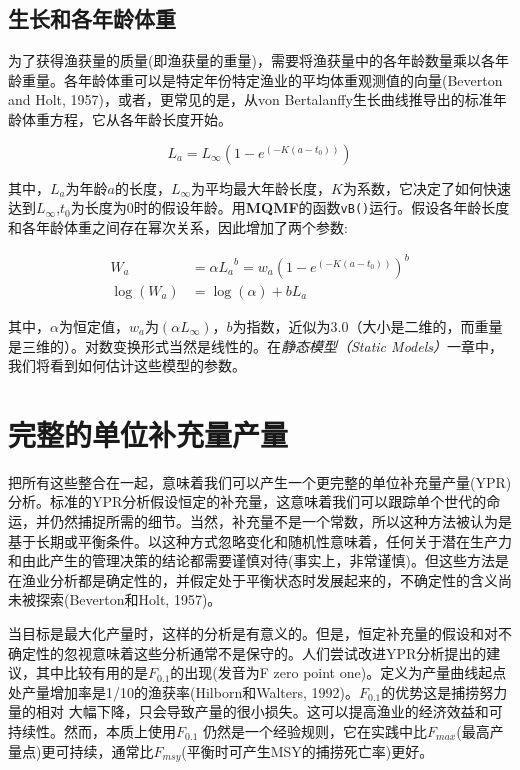 \documentclass[
  lang=cn,
  11pt,
  scheme=chinese,
  chinesefont=nofont,
  citestyle=gb7714-2015,
  bibstyle=gb7714-2015]{elegantbook}
\begin{document}
\subsection{生长和各年龄体重}\label{ux751fux957fux548cux5404ux5e74ux9f84ux4f53ux91cd}

为了获得渔获量的质量(即渔获量的重量)，需要将渔获量中的各年龄数量乘以各年龄重量。各年龄体重可以是特定年份特定渔业的平均体重观测值的向量(Beverton and Holt, 1957)，或者，更常见的是，从von Bertalanffy生长曲线推导出的标准年龄体重方程，它从各年龄长度开始。

\begin{equation}  
L_{a}=L_{\infty}(1-e^{(-K(a-t_0))})  
\label{eq:eq313}  
\end{equation}

其中，\(L_a\)为年龄\(a\)的长度，\(L_{\infty}\)为平均最大年龄长度，\(K\)为系数，它决定了如何快速达到\(L_{\infty}\),\(t_0\)为长度为0时的假设年龄。用\textbf{MQMF}的函数\texttt{vB()}运行。假设各年龄长度和各年龄体重之间存在幂次关系，因此增加了两个参数:

\begin{equation}  
\begin{split}  
{W_a}  &= {\alpha}{L_a}^{b}=w_a(1-e^{(-K(a-t_0))})^{b} \\  
{\log{(W_a)}} &= \log{(\alpha)}+{b}{L_a}  
\end{split}  
\label{eq:eq314}  
\end{equation}

其中，\(\alpha\)为恒定值，\(w_a\)为\((\alpha L_{\infty})\)，\(b\)为指数，近似为3.0（大小是二维的，而重量是三维的）。对数变换形式当然是线性的。在\emph{静态模型（Static Models）}一章中，我们将看到如何估计这些模型的参数。

\section{完整的单位补充量产量}\label{ux5b8cux6574ux7684ux5355ux4f4dux8865ux5145ux91cfux4ea7ux91cf}

把所有这些整合在一起，意味着我们可以产生一个更完整的单位补充量产量(YPR)分析。标准的YPR分析假设恒定的补充量，这意味着我们可以跟踪单个世代的命运，并仍然捕捉所需的细节。当然，补充量不是一个常数，所以这种方法被认为是基于长期或平衡条件。以这种方式忽略变化和随机性意味着，任何关于潜在生产力和由此产生的管理决策的结论都需要谨慎对待(事实上，非常谨慎)。但这些方法是在渔业分析都是确定性的，并假定处于平衡状态时发展起来的，不确定性的含义尚未被探索(Beverton和Holt, 1957)。

当目标是最大化产量时，这样的分析是有意义的。但是，恒定补充量的假设和对不确定性的忽视意味着这些分析通常不是保守的。人们尝试改进YPR分析提出的建议，其中比较有用的是\(F_{0.1}\)的出现(发音为F zero point one)。定义为产量曲线起点处产量增加率是1/10的渔获率(Hilborn和Walters, 1992)。\(F_{0.1}\)的优势这是捕捞努力量的相对 大幅下降，只会导致产量的很小损失。这可以提高渔业的经济效益和可持续性。然而，本质上使用\(F_{0.1}\) 仍然是一个经验规则，它在实践中比\(F_{max}\)(最高产量点)更可持续，通常比\(F_{msy}\)(平衡时可产生MSY的捕捞死亡率)更好。
\end{document}
